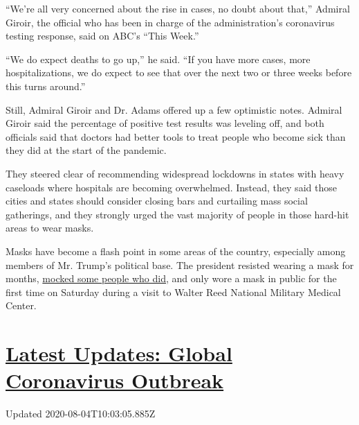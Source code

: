 ``We're all very concerned about the rise in cases, no doubt about
that,'' Admiral Giroir, the official who has been in charge of the
administration's coronavirus testing response, said on ABC's ``This
Week.''

``We do expect deaths to go up,'' he said. ``If you have more cases,
more hospitalizations, we do expect to see that over the next two or
three weeks before this turns around.''

Still, Admiral Giroir and Dr. Adams offered up a few optimistic notes.
Admiral Giroir said the percentage of positive test results was leveling
off, and both officials said that doctors had better tools to treat
people who become sick than they did at the start of the pandemic.

They steered clear of recommending widespread lockdowns in states with
heavy caseloads where hospitals are becoming overwhelmed. Instead, they
said those cities and states should consider closing bars and curtailing
mass social gatherings, and they strongly urged the vast majority of
people in those hard-hit areas to wear masks.

Masks have become a flash point in some areas of the country, especially
among members of Mr. Trump's political base. The president resisted
wearing a mask for months,
\href{https://www.washingtonpost.com/politics/trumps-mockery-of-wearing-masks-divides-republicans/2020/05/26/2c2bdc02-9f61-11ea-81bb-c2f70f01034b_story.html}{mocked
some people who did,} and only wore a mask in public for the first time
on Saturday during a visit to Walter Reed National Military Medical
Center.

\hypertarget{latest-updates-global-coronavirus-outbreak}{%
\section{\texorpdfstring{\href{https://www.nytimes3xbfgragh.onion/2020/08/04/world/coronavirus-covid-19.html?action=click\&pgtype=Article\&state=default\&region=MAIN_CONTENT_1\&context=storylines_live_updates}{Latest
Updates: Global Coronavirus
Outbreak}}{Latest Updates: Global Coronavirus Outbreak}}\label{latest-updates-global-coronavirus-outbreak}}

Updated 2020-08-04T10:03:05.885Z

